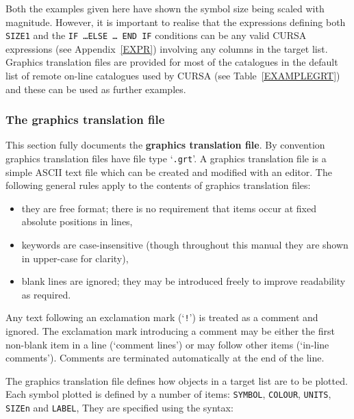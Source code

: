 \documentclass[twoside,11pt]{starlink}
\begin{document}
Both the examples given here have shown the symbol size being scaled
with magnitude.  However, it is important to realise that the
expressions defining both \texttt{SIZE1} and the \texttt{IF \ldots ELSE \ldots
END IF} conditions can be any valid CURSA expressions (see
Appendix~\ref{EXPR}) involving any columns in the target list.  Graphics
translation files are provided for most of the catalogues in the default
list of remote on-line catalogues used by CURSA (see Table~\ref{EXAMPLEGRT})
and these can be used as further examples.

\subsubsection{The graphics translation file}

This section fully documents the \textbf{graphics translation file}.
By convention graphics translation files have file type `\texttt{.grt}'.
A graphics translation file is a simple ASCII text file which
can be created and modified with an editor.  The following general
rules apply to the contents of graphics translation files:

\begin{itemize}

  \item they are free format; there is no requirement that items occur
   at fixed absolute positions in lines,

  \item keywords are case-insensitive (though throughout this manual they
   are shown in upper-case for clarity),

  \item blank lines are ignored; they may be introduced freely to
   improve readability as required.

\end{itemize}

Any text following an exclamation mark (`\texttt{!}') is treated as a
comment and ignored.  The exclamation mark introducing a comment may
be either the first non-blank item in a line (`comment lines') or
may follow other items (`in-line comments').  Comments are terminated
automatically at the end of the line.

The graphics translation file defines how objects in a target list are
to be plotted.  Each symbol plotted is defined by a number of items:
\texttt{SYMBOL}, \texttt{COLOUR}, \texttt{UNITS}, \texttt{SIZEn} and \texttt{LABEL},
They are specified using the syntax:
\end{document}
